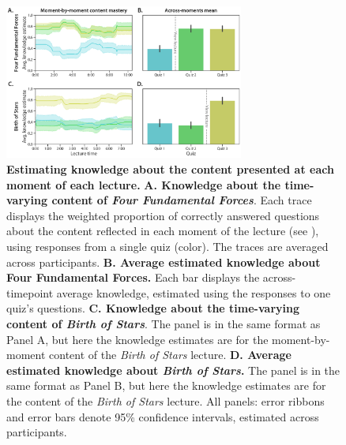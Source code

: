 \documentclass[10pt]{article}
\renewcommand{\nameref}[1]{\mbox{\textit{\oldnameref{#1}}}}
\begin{document}
\begin{figure}[tp]
    \centering
    \includegraphics[width=0.7\textwidth]{figs/content-mastery}

    \caption{\textbf{Estimating knowledge about the content presented at each
    moment of each lecture.} \textbf{A. Knowledge about the time-varying
    content of \textit{Four Fundamental Forces}}. Each trace displays the
    weighted proportion of correctly answered questions about the content
    reflected in each moment of the lecture (see \nameref{subsec:traces}),
    using responses from a single quiz (color). The traces are averaged across
    participants. \textbf{B. Average estimated knowledge about \textbf{Four
    Fundamental Forces}.} Each bar displays the across-timepoint average
    knowledge, estimated using the responses to one quiz's questions.
    \textbf{C. Knowledge about the time-varying content of \textit{Birth of
    Stars}}. The panel is in the same format as Panel A, but here the knowledge
    estimates are for the moment-by-moment content of the \textit{Birth of
    Stars} lecture. \textbf{D. Average estimated knowledge about \textit{Birth
    of Stars}.} The panel is in the same format as Panel B, but here the
    knowledge estimates are for the content of the \textit{Birth of Stars}
    lecture. All panels: error ribbons and error bars denote 95\% confidence
    intervals, estimated across participants.}

    \label{fig:knowledge-timeseries}
\end{figure}
\end{document}
